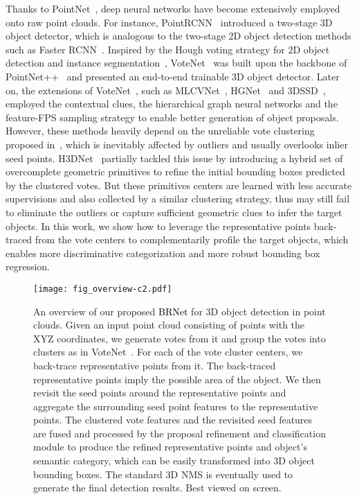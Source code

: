 \documentclass[final]{cvpr}
\newcommand{\method}{\textcolor{black}{BRNet }}
\begin{document}
Thanks to PointNet~\cite{pointnet}, deep neural networks have become extensively employed onto raw point clouds.
For instance, PointRCNN~\cite{pointrcnn} introduced a two-stage 3D object detector, which is analogous to the two-stage 2D object detection methods such as Faster RCNN~\cite{faster-rcnn}.
Inspired by the Hough voting strategy for 2D object detection and instance segmentation~\cite{robust-hough}, VoteNet~\cite{votenet} was built upon the backbone of PointNet++~\cite{qi2017pointnet++} and presented an end-to-end trainable 3D object detector.
Later on, the extensions of VoteNet~\cite{votenet}, such as MLCVNet~\cite{mlcvnet}, HGNet~\cite{hgnet} and 3DSSD~\cite{yang20203dssd}, employed the contextual clues, the hierarchical graph neural networks and the feature-FPS sampling strategy to enable better generation of object proposals.
However, these methods heavily depend on the unreliable vote clustering proposed in~\cite{votenet}, which is inevitably affected by outliers and usually overlooks inlier seed points.
H3DNet~\cite{h3dnet} partially tackled this issue by introducing a hybrid set of overcomplete geometric primitives to refine the initial bounding boxes predicted by the clustered votes.
But these primitives centers are learned with less accurate supervisions and also collected by a similar clustering strategy, thus may still fail to eliminate the outliers or capture sufficient geometric clues to infer the target objects.
In this work, we show how to leverage the representative points back-traced from the vote centers to complementarily profile the target objects, which enables more discriminative categorization and more robust bounding box regression.


\begin{figure*}
    \centering
    \texttt{[image: fig\_overview-c2.pdf]}
    \caption{
An overview of our proposed \method for 3D object detection in point clouds. 
Given an input point cloud consisting of  points with the XYZ coordinates, we generate votes from it and group the votes into  clusters as in VoteNet~\cite{votenet}. 
For each of the  vote cluster centers, we back-trace  representative points from it. 
The back-traced representative points imply the possible area of the object. We then revisit the seed points around the representative points and aggregate the surrounding seed point features to the representative points. 
The clustered vote features and the revisited seed features are fused and processed by the proposal refinement and classification module to produce the refined representative points and object's semantic category, which can be easily transformed into 3D object bounding boxes. 
The standard 3D NMS is eventually used to generate the final detection results. Best viewed on screen.
    }
    \label{fig:method}
\end{figure*}
\end{document}
